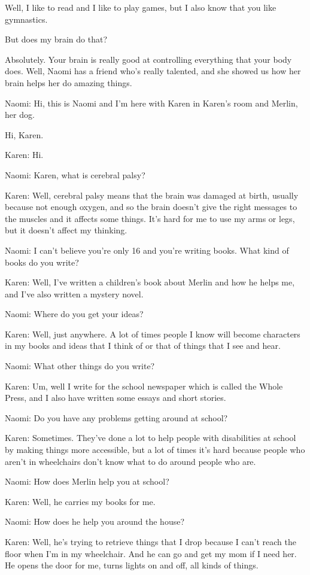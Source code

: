 Well, I like to read and I like to play games, but I also know that you like gymnastics.

But does my brain do that?

Absolutely. Your brain is really good at controlling everything that your body does. Well, Naomi has a friend who's really talented, and she showed us how her brain helps her do amazing things.

Naomi: Hi, this is Naomi and I'm here with Karen in Karen's room and Merlin, her dog.

Hi, Karen.

Karen: Hi.

Naomi: Karen, what is cerebral palsy?

Karen: Well, cerebral palsy means that the brain was damaged at birth, usually because not enough oxygen, and so the brain doesn't give the right messages to the muscles and it affects some things. It's hard for me to use my arms or legs, but it doesn't affect my thinking.

Naomi: I can't believe you're only 16 and you're writing books. What kind of books do you write?

Karen: Well, I've written a children's book about Merlin and how he helps me, and I've also written a mystery novel.

Naomi: Where do you get your ideas?

Karen: Well, just anywhere. A lot of times people I know will become characters in my books and ideas that I think of or that of things that I see and hear.

Naomi: What other things do you write?

Karen: Um, well I write for the school newspaper which is called the Whole Press, and I also have written some essays and short stories.

Naomi: Do you have any problems getting around at school?

Karen: Sometimes. They've done a lot to help people with disabilities at school by making things more accessible, but a lot of times it's hard because people who aren't in wheelchairs don't know what to do around people who are.

Naomi: How does Merlin help you at school?

Karen: Well, he carries my books for me.

Naomi: How does he help you around the house?

Karen: Well, he's trying to retrieve things that I drop because I can't reach the floor when I'm in my wheelchair. And he can go and get my mom if I need her. He opens the door for me, turns lights on and off, all kinds of things.

